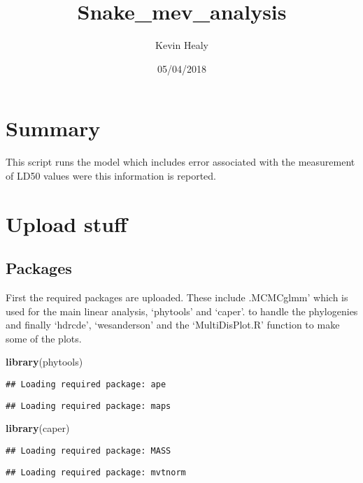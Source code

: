 \documentclass[]{article}
\title{Snake\_mev\_analysis}
\author{Kevin Healy}
\date{05/04/2018}
\newenvironment{Shaded}{\begin{snugshade}}{\end{snugshade}}
\newcommand{\KeywordTok}[1]{\textcolor[rgb]{0.13,0.29,0.53}{\textbf{#1}}}
\newcommand{\NormalTok}[1]{#1}
\begin{document}
\maketitle

\section{Summary}\label{summary}

This script runs the model which includes error associated with the
measurement of LD50 values were this information is reported.

\section{Upload stuff}\label{upload-stuff}

\subsection{Packages}\label{packages}

First the required packages are uploaded. These include .MCMCglmm' which
is used for the main linear analysis, `phytools' and `caper'. to handle
the phylogenies and finally `hdrcde', `wesanderson' and the
`MultiDisPlot.R' function to make some of the plots.

\begin{Shaded}
\begin{Highlighting}[]
\KeywordTok{library}\NormalTok{(phytools)}
\end{Highlighting}
\end{Shaded}

\begin{verbatim}
## Loading required package: ape
\end{verbatim}

\begin{verbatim}
## Loading required package: maps
\end{verbatim}

\begin{Shaded}
\begin{Highlighting}[]
\KeywordTok{library}\NormalTok{(caper)}
\end{Highlighting}
\end{Shaded}

\begin{verbatim}
## Loading required package: MASS
\end{verbatim}

\begin{verbatim}
## Loading required package: mvtnorm
\end{verbatim}
\end{document}

